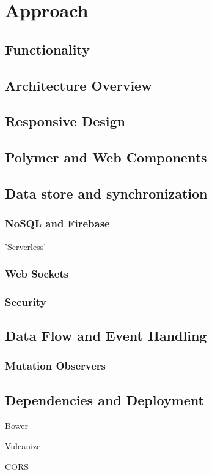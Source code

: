 \chapter{Approach}
%

\section{Functionality}

\section{Architecture Overview}

\section{Responsive Design}

\section{Polymer and Web Components}

\section{Data store and synchronization}
\subsection{NoSQL and Firebase}

'Serverless'

\subsection{Web Sockets}

\subsection{Security}

\section{Data Flow and Event Handling}

\subsection{Mutation Observers}

\section{Dependencies and Deployment}

Bower

Vulcanize

CORS

